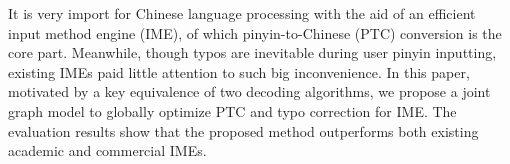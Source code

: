 It is very import for Chinese language processing with the aid of an efficient input method engine (IME), of which pinyin-to-Chinese (PTC) conversion is the core part. Meanwhile, though typos are inevitable during user pinyin inputting, existing IMEs paid little attention to such big inconvenience. In this paper, motivated by a key equivalence of two decoding algorithms, we propose a joint graph model to globally optimize PTC and typo correction for IME. The evaluation results show that the proposed method outperforms both existing academic and commercial IMEs.
